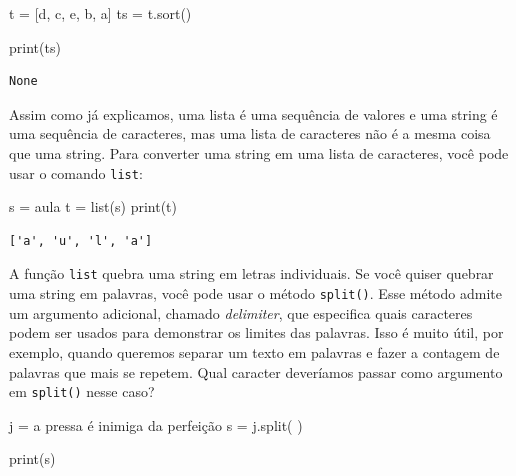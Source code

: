 \documentclass[
  brazilian,
  letterpaper,
  DIV=11,
  numbers=noendperiod]{scrreprt}
\newenvironment{Shaded}{\begin{snugshade}}{\end{snugshade}}
\newcommand{\BuiltInTok}[1]{\textcolor[rgb]{0.00,0.23,0.31}{#1}}
\newcommand{\NormalTok}[1]{\textcolor[rgb]{0.00,0.23,0.31}{#1}}
\newcommand{\OperatorTok}[1]{\textcolor[rgb]{0.37,0.37,0.37}{#1}}
\newcommand{\StringTok}[1]{\textcolor[rgb]{0.13,0.47,0.30}{#1}}
\begin{document}
\begin{Shaded}
\begin{Highlighting}[]
\NormalTok{t }\OperatorTok{=}\NormalTok{ [}\StringTok{\textquotesingle{}d\textquotesingle{}}\NormalTok{, }\StringTok{\textquotesingle{}c\textquotesingle{}}\NormalTok{, }\StringTok{\textquotesingle{}e\textquotesingle{}}\NormalTok{, }\StringTok{\textquotesingle{}b\textquotesingle{}}\NormalTok{, }\StringTok{\textquotesingle{}a\textquotesingle{}}\NormalTok{]}
\NormalTok{ts }\OperatorTok{=}\NormalTok{ t.sort()}

\BuiltInTok{print}\NormalTok{(ts)}
\end{Highlighting}
\end{Shaded}

\begin{verbatim}
None
\end{verbatim}

Assim como já explicamos, uma lista é uma sequência de valores e uma
string é uma sequência de caracteres, mas uma lista de caracteres não é
a mesma coisa que uma string. Para converter uma string em uma lista de
caracteres, você pode usar o comando \texttt{list}:

\begin{Shaded}
\begin{Highlighting}[]
\NormalTok{s }\OperatorTok{=} \StringTok{\textquotesingle{}aula\textquotesingle{}}
\NormalTok{t }\OperatorTok{=} \BuiltInTok{list}\NormalTok{(s)}
\BuiltInTok{print}\NormalTok{(t)}
\end{Highlighting}
\end{Shaded}

\begin{verbatim}
['a', 'u', 'l', 'a']
\end{verbatim}

A função \texttt{list} quebra uma string em letras individuais. Se você
quiser quebrar uma string em palavras, você pode usar o método
\texttt{split()}. Esse método admite um argumento adicional, chamado
\emph{delimiter}, que especifica quais caracteres podem ser usados para
demonstrar os limites das palavras. Isso é muito útil, por exemplo,
quando queremos separar um texto em palavras e fazer a contagem de
palavras que mais se repetem. Qual caracter deveríamos passar como
argumento em \texttt{split()} nesse caso?

\begin{Shaded}
\begin{Highlighting}[]
\NormalTok{j }\OperatorTok{=} \StringTok{\textquotesingle{}a pressa é inimiga da perfeição\textquotesingle{}}
\NormalTok{s }\OperatorTok{=}\NormalTok{ j.split(}\StringTok{\textquotesingle{} \textquotesingle{}}\NormalTok{)}

\BuiltInTok{print}\NormalTok{(s)}
\end{Highlighting}
\end{Shaded}
\end{document}
